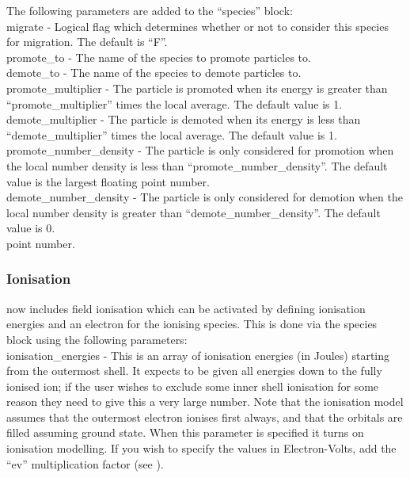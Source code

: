 The following parameters are added to the ``species'' block:\\

{\emphtext migrate} - Logical flag which determines whether or not to consider
  this species for migration. The default is ``F''.\\

{\emphtext promote\_to} - The name of the species to promote particles to.\\

{\emphtext demote\_to} - The name of the species to demote particles to.\\

{\emphtext promote\_multiplier} - The particle is promoted when its energy is
  greater than ``promote\_multiplier'' times the local average.  The default
  value is 1.\\

{\emphtext demote\_multiplier}  - The particle is demoted when its energy is
  less than ``demote\_multiplier'' times the local average.  The default value
  is 1.\\

{\emphtext promote\_number\_density} - The particle is only considered for
  promotion when the local number density is less than
  ``promote\_number\_density''.  The default value is the largest floating
  point number.\\

{\emphtext demote\_number\_density} - The particle is only considered for
  demotion when the local number density is greater than
  ``demote\_number\_density''.  The default value is 0.\\
  point number.\\


\subsubsection{Ionisation}
\label{sec:ionisation}

{\EPOCH} now includes field ionisation which can be activated by defining
ionisation energies and an electron for the ionising species. This is done
via the species block using the following parameters:\\

{\emphtext ionisation\_energies} - This is an array of ionisation energies
  (in Joules) starting from the outermost shell. It expects to be given all
  energies down to the fully ionised ion; if the user wishes to exclude some
  inner shell ionisation for some reason they need to give this a very large
  number. Note that the ionisation model assumes that the outermost electron
  ionises first always, and that the orbitals are filled assuming ground
  state. When this parameter is specified it turns on ionisation modelling.
  If you wish to specify the values in Electron-Volts, add the ``ev''
  multiplication factor (see ).\\

